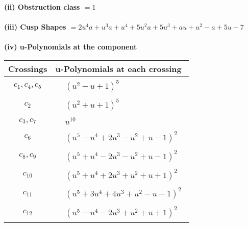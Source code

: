 \documentclass[1p]{elsarticle_modified}
\theoremstyle{definition}
\begin{document}
\flushleft \textbf{(ii) Obstruction class $= 1$}\\~\\
\flushleft \textbf{(iii) Cusp Shapes $= 2 u^4 a+u^3 a+u^4+5 u^2 a+5 u^3+a u+u^2- a+5 u-7$}\\~\\
\newpage\renewcommand{\arraystretch}{1}
\flushleft \textbf{(iv) u-Polynomials at the component}\newline \\
\begin{tabular}{m{50pt}|m{274pt}}
Crossings & \hspace{64pt}u-Polynomials at each crossing \\
\hline $$\begin{aligned}c_{1},c_{4},c_{5}\end{aligned}$$&$\begin{aligned}
&(u^2- u+1)^5
\end{aligned}$\\
\hline $$\begin{aligned}c_{2}\end{aligned}$$&$\begin{aligned}
&(u^2+u+1)^5
\end{aligned}$\\
\hline $$\begin{aligned}c_{3},c_{7}\end{aligned}$$&$\begin{aligned}
&u^{10}
\end{aligned}$\\
\hline $$\begin{aligned}c_{6}\end{aligned}$$&$\begin{aligned}
&(u^5- u^4+2 u^3- u^2+u-1)^2
\end{aligned}$\\
\hline $$\begin{aligned}c_{8},c_{9}\end{aligned}$$&$\begin{aligned}
&(u^5+u^4-2 u^3- u^2+u-1)^2
\end{aligned}$\\
\hline $$\begin{aligned}c_{10}\end{aligned}$$&$\begin{aligned}
&(u^5+u^4+2 u^3+u^2+u+1)^2
\end{aligned}$\\
\hline $$\begin{aligned}c_{11}\end{aligned}$$&$\begin{aligned}
&(u^5+3 u^4+4 u^3+u^2- u-1)^2
\end{aligned}$\\
\hline $$\begin{aligned}c_{12}\end{aligned}$$&$\begin{aligned}
&(u^5- u^4-2 u^3+u^2+u+1)^2
\end{aligned}$\\
\hline
\end{tabular}\\~\\
\end{document}
